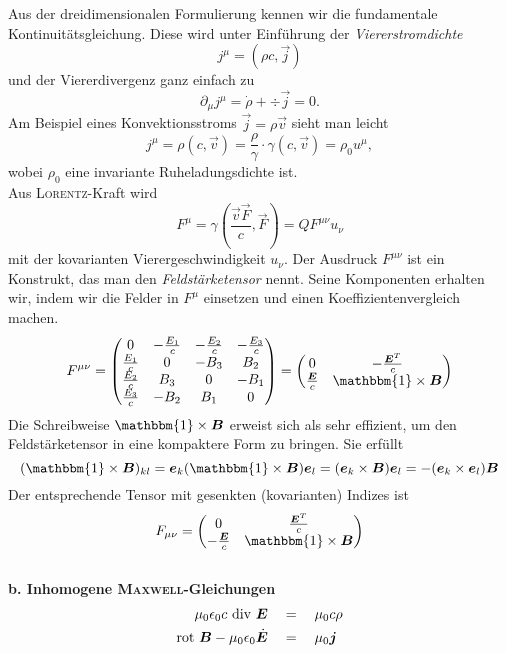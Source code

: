 Aus der dreidimensionalen Formulierung kennen wir die fundamentale Kontinuitätsgleichung. Diese wird unter Einführung der \emph{Viererstromdichte}
\begin{equation*}
j^\mu  = (\rho c, \vec{j})
\end{equation*}
und der Viererdivergenz ganz einfach zu
\begin{equation*}
\partial_\mu j^\mu = \dot{\rho}+\div\vec{j}= 0 .
\end{equation*}
Am Beispiel eines Konvektionsstroms $\vec{j}=\rho\vec{v}$ sieht man leicht
\begin{equation*}
j^\mu = \rho(c,\vec{v}) = \frac{\rho}{\gamma} \cdot\gamma(c,\vec{v}) = \rho_0 u^\mu,
\end{equation*}
wobei $\rho_0$ eine invariante Ruheladungsdichte ist.\\
Aus \textsc{Lorentz}-Kraft wird
\begin{equation*}
F^\mu =\gamma\left(\frac{\vec{v}\vec{F}}{c},\vec{F}\right)= QF^{\mu\nu}u_\nu
\end{equation*}
mit der kovarianten Vierergeschwindigkeit $u_\nu$. Der Ausdruck $F^{\mu\nu}$ ist ein Konstrukt, das man den \emph{Feldstärketensor} nennt. Seine Komponenten erhalten wir, indem wir die Felder in $F^\mu$ einsetzen und einen Koeffizientenvergleich machen.
\begin{equation*}
F^{\mu\nu}=\begin{pmatrix}
0 & -\frac{E_1}{c} & -\frac{E_2}{c} & -\frac{E_3}{c}\\
\frac{E_1}{c} & 0 & -B_3 & B_2\\
\frac{E_2}{c} & B_3 & 0 & -B_1\\ 
\frac{E_3}{c} & -B_2 & B_1 & 0
\end{pmatrix} = \begin{pmatrix}
0 & -\frac{\vec{E}^T}{c} \\
\frac{\vec{E}}{c} & \mathbbm{1}\times\vec{B}
\end{pmatrix}
\end{equation*}
Die Schreibweise $\mathbbm{1}\times\vec{B}$ erweist sich als sehr effizient, um den Feldstärketensor in eine kompaktere Form zu bringen. Sie erfüllt
\begin{equation*}
(\mathbbm{1}\times\vec{B})_{kl}=\vec{e}_k(\mathbbm{1}\times\vec{B})\vec{e}_l = (\vec{e}_k\times\vec{B})\vec{e}_l = -(\vec{e}_k\times\vec{e}_l)\vec{B}
\end{equation*}
Der entsprechende Tensor mit gesenkten (kovarianten) Indizes ist
\begin{equation*}
F_{\mu\nu}= \begin{pmatrix}
0 & \frac{\vec{E}^T}{c} \\
-\frac{\vec{E}}{c} & \mathbbm{1}\times\vec{B}\end{pmatrix}
\end{equation*}
\ \\
\textbf{b. Inhomogene \textsc{Maxwell}-Gleichungen}
\begin{align*}
\mu_0\epsilon_0 c \ \text{div }\bm{E}\quad&=\quad\mu_0c\rho\\
\text{rot } \bm{B} -\mu_0\epsilon_0\dot{\bm{E}}\quad&=\quad\mu_0\bm{j}
\end{align*}

